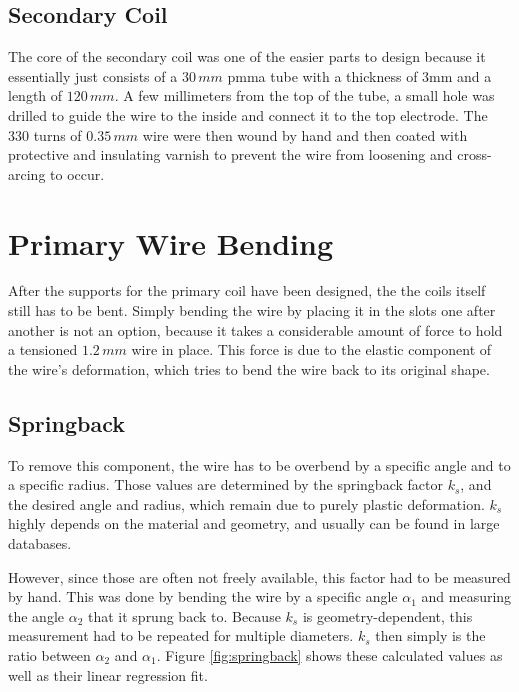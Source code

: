 \subsection{Secondary Coil}

The core of the secondary coil was one of the easier parts to design because it essentially just consists of a \(30\,mm\) \gls{pmma} tube with a thickness of 3mm and a length of \(120\,mm\). A few millimeters from the top of the tube, a small hole was drilled to guide the wire to the inside and connect it to the top electrode. The 330 turns of \(0.35\,mm\) wire were then wound by hand and then coated with protective and insulating varnish to prevent the wire from loosening and cross-arcing to occur.

\section{Primary Wire Bending}

After the supports for the primary coil have been designed, the the coils itself still has to be bent. Simply bending the wire by placing it in the slots one after another is not an option, because it takes a considerable amount of force to hold a tensioned \(1.2\,mm\) wire in place. 
This force is due to the elastic component of the wire's deformation, which tries to bend the wire back to its original shape. 

\subsection{Springback}

To remove this component, the wire has to be overbend by a specific angle and to a specific radius. Those values are determined by the springback factor \(k_s\), and the desired angle and radius, which remain due to purely plastic deformation. \(k_s\) highly depends on the material and geometry, and usually can be found in large databases.

However, since those are often not freely available, this factor had to be measured by hand. This was done by bending the wire by a specific angle \(\alpha_1\) and measuring the angle \(\alpha_2\) that it sprung back to. Because \(k_s\) is geometry-dependent, this measurement had to be repeated for multiple diameters. \(k_s\) then simply is the ratio between \(\alpha_2\) and \(\alpha_1\). Figure \ref{fig:springback} shows these calculated values as well as their linear regression fit.

